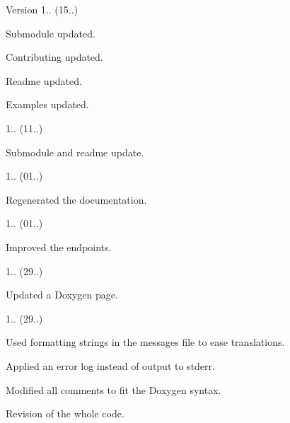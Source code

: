 \begin{DoxyVersion}{Version}
1.. (15..)
\begin{DoxyItemize}
\item Submodule updated.
\item Contributing updated.
\item Readme updated.
\item Examples updated. 
\end{DoxyItemize}

1.. (11..)
\begin{DoxyItemize}
\item Submodule and readme update. 
\end{DoxyItemize}

1.. (01..)
\begin{DoxyItemize}
\item Regenerated the documentation. 
\end{DoxyItemize}

1.. (01..)
\begin{DoxyItemize}
\item Improved the endpoints. 
\end{DoxyItemize}

1.. (29..)
\begin{DoxyItemize}
\item Updated a Doxygen page. 
\end{DoxyItemize}

1.. (29..)
\begin{DoxyItemize}
\item Used formatting strings in the messages file to ease translations.
\item Applied an error log instead of output to stderr.
\item Modified all comments to fit the Doxygen syntax.
\item Revision of the whole code. 
\end{DoxyItemize}
\end{DoxyVersion}
